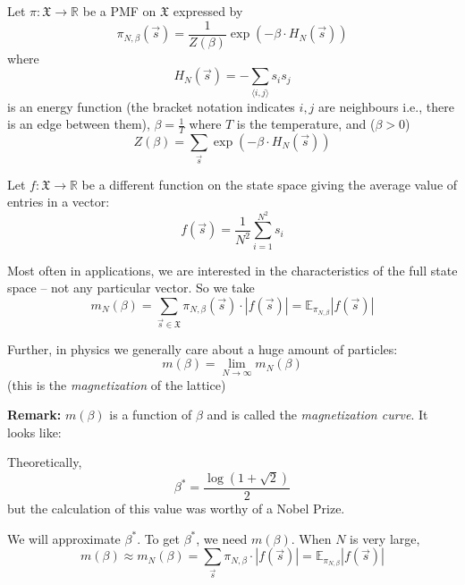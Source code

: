 \documentclass[12pt]{article}
\newcommand{\R}{\mathbb{R}}
\newcommand{\E}{\mathbb{E}}
\newcommand{\mfX}{\mathfrak{X}}
\newcommand{\abs}[1]{\left\vert #1 \right\vert}
\begin{document}
        Let $\pi: \mfX \to \R$ be a PMF on $\mfX$ expressed by 
        \[\pi_{N, \beta}(\vec{s}) = \frac{1}{Z(\beta)}\exp(-\beta \cdot H_N(\vec s))\]
        where 
        \[H_N(\vec s) = -\sum_{\langle i, j\rangle} s_i s_j\]
        is an energy function (the bracket notation indicates $i, j$ are neighbours i.e., there is an edge between them), $\beta = \frac{1}{T}$ where $T$ is the temperature, and ($\beta > 0$)
        \[Z(\beta) = \sum_{\vec s} \exp(-\beta \cdot H_N(\vec s))\]

        Let $f: \mfX \to \R$ be a different function on the state space giving the average value of entries in a vector:
        \[f(\vec s) = \frac{1}{N^2}\sum_{i=1}^{N^2}s_i\]

        Most often in applications, we are interested in the characteristics of the full state space -- not any particular vector. So we take 
        \[m_N(\beta) = \sum_{\vec s \in \mfX} \pi_{N, \beta}(\vec s) \cdot \abs{f(\vec s)} = \E_{\pi_{N, \beta}}\abs{f(\vec s)}\]

        Further, in physics we generally care about a huge amount of particles:
        \[m(\beta) = \lim_{N\to \infty} m_N(\beta)\]
        (this is the \emph{magnetization} of the lattice)

        \textbf{Remark:} $m(\beta)$ is a function of $\beta$ and is called the \emph{magnetization curve}. It looks like:

        \begin{center}
        \end{center}

        Theoretically, 
        \[\beta^* = \frac{\log(1 + \sqrt 2)}{2}\]
        but the calculation of this value was worthy of a Nobel Prize. 

        We will approximate $\beta^*$. To get $\beta^*$, we need $m(\beta)$. When $N$ is very large, 
        \[m(\beta) \approx m_N(\beta) = \sum_{\vec s} \pi_{N,\beta} \cdot \abs{f(\vec s)} = \E_{\pi_{N, \beta}} \abs{f(\vec s)}\]
\end{document}
